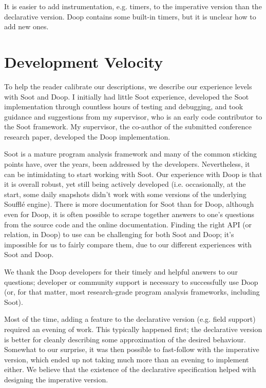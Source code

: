 It is easier to add instrumentation, e.g. timers, to the imperative version than the declarative version. Doop contains some built-in timers, but it is unclear how to add new ones.

\section{Development Velocity}

To help the reader calibrate our descriptions, we describe our experience levels with Soot and Doop. I initially had little Soot experience, developed the Soot implementation through countless hours of testing and debugging, and took guidance and suggestions from my supervisor, who is an early code contributor to the Soot framework. My supervisor, the co-author of the submitted conference research paper, developed the Doop implementation.

Soot is a mature program analysis framework and many of the common sticking points have, over the years, been addressed by the developers. Nevertheless, it can be intimidating to start working with Soot. Our experience with Doop is that it is overall robust, yet still being actively developed (i.e. occasionally, at the start, some daily snapshots didn't work with some versions of the underlying Soufflé engine). There is more documentation for Soot than for Doop, although even for Doop, it is often possible to scrape together answers to one's questions from the source code and the online documentation. Finding the right API (or relation, in Doop) to use can be challenging for both Soot and Doop; it's impossible for us to fairly compare them, due to our different experiences with Soot and Doop.

We thank the Doop developers for their timely and helpful answers to our questions; developer or community support is necessary to successfully use Doop (or, for that matter, most research-grade program analysis frameworks, including Soot).

Most of the time, adding a feature to the declarative version (e.g. field support) required an evening of work. This typically happened first; the declarative version is better for cleanly describing some approximation of the desired behaviour. Somewhat to our surprise, it was then possible to fast-follow with the imperative version, which ended up not taking much more than an evening to implement either. We believe that the existence of the declarative specification helped with designing the imperative version.

